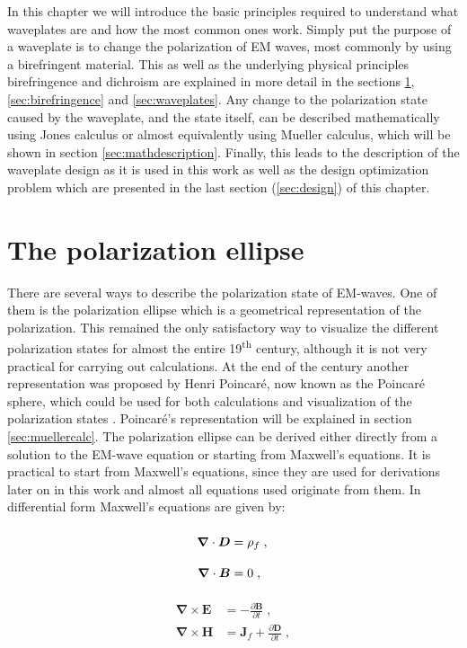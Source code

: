 In this chapter we will introduce the basic principles required to understand what waveplates are and how the most common ones work. Simply put the purpose of a waveplate is to change the polarization of EM waves, most commonly by using a birefringent material. This as well as the underlying physical principles birefringence and dichroism are explained in more detail in the sections \ref{sec:polellipse}, \ref{sec:birefringence} and \ref{sec:waveplates}. Any change to the polarization state caused by the waveplate, and the state itself, can be described mathematically using Jones calculus or almost equivalently using Mueller calculus, which will be shown in section \ref{sec:mathdescription}. Finally, this leads to the description of the waveplate design as it is used in this work as well as the design optimization problem which are presented in the last section (\ref{sec:design}) of this chapter.

\section{The polarization ellipse}
\label{sec:polellipse}
There are several ways to describe the polarization state of EM-waves. One of them is the polarization ellipse which is a geometrical representation of the polarization. This remained the only satisfactory way to visualize the different polarization states for almost the entire 19\textsuperscript{th} century, although it is not very practical for carrying out calculations. At the end of the century another representation was proposed by Henri Poincaré, now known as the Poincaré sphere, which could be used for both calculations and visualization of the polarization states \cite{Collett2008VisualizationSphere}. Poincaré's representation will be explained in section \ref{sec:muellercalc}. The polarization ellipse can be derived either directly from a solution to the EM-wave equation or starting from Maxwell's equations.  It is practical to start from Maxwell's equations, since they are used for derivations later on in this work and almost all equations used originate from them. In differential form Maxwell's equations are given by: 
\par
\noindent\begin{minipage}{.5\linewidth}
\begin{align}
    \bm{\nabla}\cdot\bm{D} &=\rho_{f}\;,\label{eq:maxwell1}
    \vphantom{\frac{\partial\bm{B}}{\partial t}}\\
    \bm{\nabla}\cdot\bm{B} &=0\;,\vphantom{\frac{\partial\bm{B}}{\partial t}}\label{eq:maxwell2}
\end{align}
\end{minipage}%
\begin{minipage}{.5\linewidth}
\begin{align}
    \bm{\nabla}\times\bm{E} &=-\frac{\partial\bm{B}}{\partial t}\;,\label{eq:maxwell3}
    \\
    \bm{\nabla}\times\bm{H} &=\bm{J}_f
    +\frac{\partial\bm{D}}{\partial t}\;,\label{eq:maxwell4}
\end{align}
\end{minipage}
\newline

